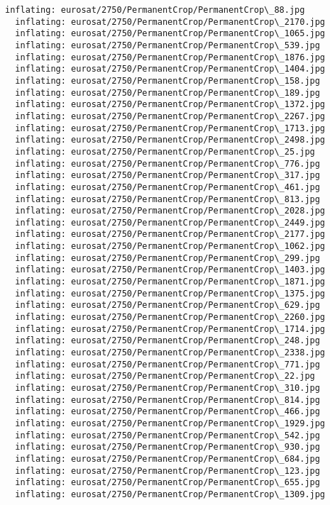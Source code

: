 \documentclass[11pt]{article}
\begin{document}
\begin{Verbatim}[commandchars=\\\{\}]
  inflating: eurosat/2750/PermanentCrop/PermanentCrop\_88.jpg
  inflating: eurosat/2750/PermanentCrop/PermanentCrop\_2170.jpg
  inflating: eurosat/2750/PermanentCrop/PermanentCrop\_1065.jpg
  inflating: eurosat/2750/PermanentCrop/PermanentCrop\_539.jpg
  inflating: eurosat/2750/PermanentCrop/PermanentCrop\_1876.jpg
  inflating: eurosat/2750/PermanentCrop/PermanentCrop\_1404.jpg
  inflating: eurosat/2750/PermanentCrop/PermanentCrop\_158.jpg
  inflating: eurosat/2750/PermanentCrop/PermanentCrop\_189.jpg
  inflating: eurosat/2750/PermanentCrop/PermanentCrop\_1372.jpg
  inflating: eurosat/2750/PermanentCrop/PermanentCrop\_2267.jpg
  inflating: eurosat/2750/PermanentCrop/PermanentCrop\_1713.jpg
  inflating: eurosat/2750/PermanentCrop/PermanentCrop\_2498.jpg
  inflating: eurosat/2750/PermanentCrop/PermanentCrop\_25.jpg
  inflating: eurosat/2750/PermanentCrop/PermanentCrop\_776.jpg
  inflating: eurosat/2750/PermanentCrop/PermanentCrop\_317.jpg
  inflating: eurosat/2750/PermanentCrop/PermanentCrop\_461.jpg
  inflating: eurosat/2750/PermanentCrop/PermanentCrop\_813.jpg
  inflating: eurosat/2750/PermanentCrop/PermanentCrop\_2028.jpg
  inflating: eurosat/2750/PermanentCrop/PermanentCrop\_2449.jpg
  inflating: eurosat/2750/PermanentCrop/PermanentCrop\_2177.jpg
  inflating: eurosat/2750/PermanentCrop/PermanentCrop\_1062.jpg
  inflating: eurosat/2750/PermanentCrop/PermanentCrop\_299.jpg
  inflating: eurosat/2750/PermanentCrop/PermanentCrop\_1403.jpg
  inflating: eurosat/2750/PermanentCrop/PermanentCrop\_1871.jpg
  inflating: eurosat/2750/PermanentCrop/PermanentCrop\_1375.jpg
  inflating: eurosat/2750/PermanentCrop/PermanentCrop\_629.jpg
  inflating: eurosat/2750/PermanentCrop/PermanentCrop\_2260.jpg
  inflating: eurosat/2750/PermanentCrop/PermanentCrop\_1714.jpg
  inflating: eurosat/2750/PermanentCrop/PermanentCrop\_248.jpg
  inflating: eurosat/2750/PermanentCrop/PermanentCrop\_2338.jpg
  inflating: eurosat/2750/PermanentCrop/PermanentCrop\_771.jpg
  inflating: eurosat/2750/PermanentCrop/PermanentCrop\_22.jpg
  inflating: eurosat/2750/PermanentCrop/PermanentCrop\_310.jpg
  inflating: eurosat/2750/PermanentCrop/PermanentCrop\_814.jpg
  inflating: eurosat/2750/PermanentCrop/PermanentCrop\_466.jpg
  inflating: eurosat/2750/PermanentCrop/PermanentCrop\_1929.jpg
  inflating: eurosat/2750/PermanentCrop/PermanentCrop\_542.jpg
  inflating: eurosat/2750/PermanentCrop/PermanentCrop\_930.jpg
  inflating: eurosat/2750/PermanentCrop/PermanentCrop\_684.jpg
  inflating: eurosat/2750/PermanentCrop/PermanentCrop\_123.jpg
  inflating: eurosat/2750/PermanentCrop/PermanentCrop\_655.jpg
  inflating: eurosat/2750/PermanentCrop/PermanentCrop\_1309.jpg

\end{Verbatim}
\end{document}
